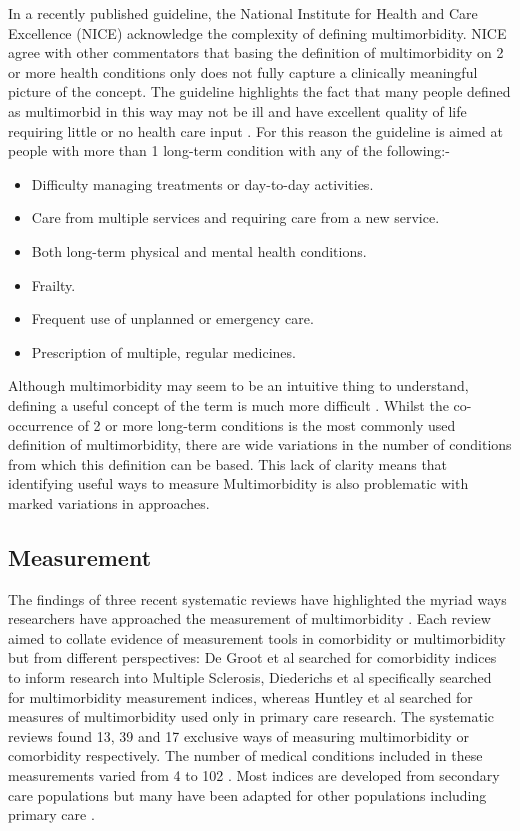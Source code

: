 \documentclass[12pt,]{report}
\providecommand{\tightlist}{%
  \setlength{\itemsep}{0pt}\setlength{\parskip}{0pt}}
\begin{document}
In a recently published guideline, the National Institute for Health and
Care Excellence (NICE) \citep{RN226} acknowledge the complexity of
defining multimorbidity. NICE agree with other commentators \citep{RN21}
that basing the definition of multimorbidity on 2 or more health
conditions only does not fully capture a clinically meaningful picture
of the concept. The guideline highlights the fact that many people
defined as multimorbid in this way may not be ill and have excellent
quality of life requiring little or no health care input \citep{RN226}.
For this reason the guideline is aimed at people with more than 1
long-term condition with any of the following:-

\begin{itemize}
\tightlist
\item
  Difficulty managing treatments or day-to-day activities.
\item
  Care from multiple services and requiring care from a new service.
\item
  Both long-term physical and mental health conditions.
\item
  Frailty.
\item
  Frequent use of unplanned or emergency care.
\item
  Prescription of multiple, regular medicines.
\end{itemize}

\citep{RN226}

Although multimorbidity may seem to be an intuitive thing to understand,
defining a useful concept of the term is much more difficult
\citep{RN155}. Whilst the co-occurrence of 2 or more long-term
conditions is the most commonly used definition of multimorbidity, there
are wide variations in the number of conditions from which this
definition can be based. This lack of clarity means that identifying
useful ways to measure Multimorbidity is also problematic with marked
variations in approaches.

\subsection{Measurement}\label{subsec:mm-measures}

The findings of three recent systematic reviews have highlighted the
myriad ways researchers have approached the measurement of
multimorbidity \citep{RN16, RN34, RN29}. Each review aimed to collate
evidence of measurement tools in comorbidity or multimorbidity but from
different perspectives: De Groot et al \citeyearpar{RN16} searched for
comorbidity indices to inform research into Multiple Sclerosis,
Diederichs et al \citeyearpar{RN34} specifically searched for
multimorbidity measurement indices, whereas Huntley et al
\citeyearpar{RN29} searched for measures of multimorbidity used only in
primary care research. The systematic reviews found 13, 39 and 17
exclusive ways of measuring multimorbidity or comorbidity respectively.
The number of medical conditions included in these measurements varied
from 4 to 102 \citeyearpar{RN34}. Most indices are developed from
secondary care populations but many have been adapted for other
populations including primary care \citep{RN34, RN29}.
\end{document}
